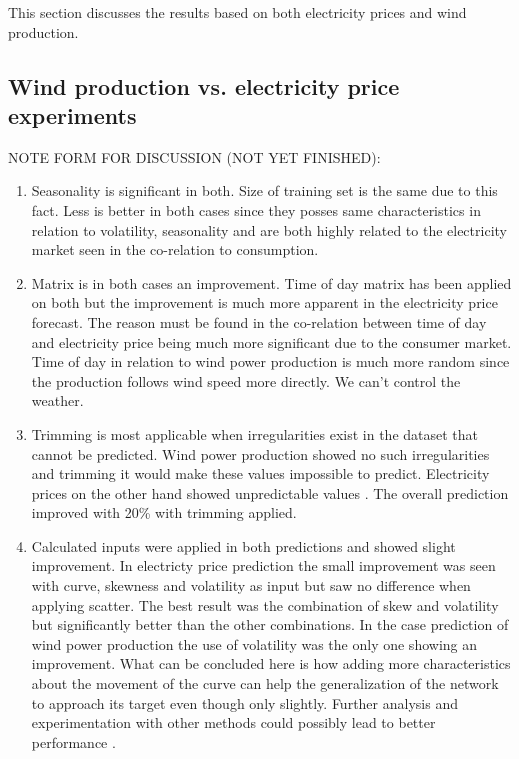 This section discusses the results based on both electricity prices and wind production.

\subsection{Wind production vs. electricity price experiments}
NOTE FORM FOR DISCUSSION (NOT YET FINISHED):

\begin{enumerate}
\item Seasonality is significant in both. Size of training set is the same due  to this fact. Less is better in both cases since they posses same characteristics in relation to volatility, seasonality and are both highly related to the electricity market seen in the co-relation to consumption.
\item Matrix is in both cases an improvement. Time of day matrix has been applied on both but the improvement is much more apparent in the electricity price forecast. The reason must be found in the co-relation between time of day and electricity price being much more significant due to the consumer market. Time of day in relation to wind power production is much more random since the production follows wind speed more directly. We can't control the weather. 
\item Trimming is most applicable when irregularities exist in the dataset that cannot be predicted. Wind power production showed no such irregularities and trimming it would make these values impossible to predict. Electricity prices on the other hand showed unpredictable values . The overall prediction improved with 20\% with trimming applied. 
\item Calculated inputs were applied in both predictions and showed slight improvement. In electricty price prediction the small improvement was seen with curve, skewness and volatility as input but saw no difference when applying scatter. The best result was the combination of skew and volatility but significantly better than the other combinations. In the case prediction of wind power production the use of volatility was the only one showing an improvement. What can be concluded here is how adding more characteristics about the movement of the curve can help the generalization of the network to approach its target even though only slightly. Further analysis and experimentation with other methods could possibly lead to better performance .

\end{enumerate}

